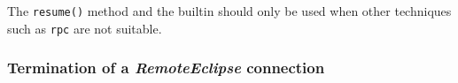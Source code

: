 The {\tt resume()} method and the  builtin should
only be used when other techniques such as {\tt rpc} are not suitable.



% 
% 
% 
%
 
\subsubsection{Termination of a {\it RemoteEclipse} connection}
\label{sec:ji-remote-disconnect}

